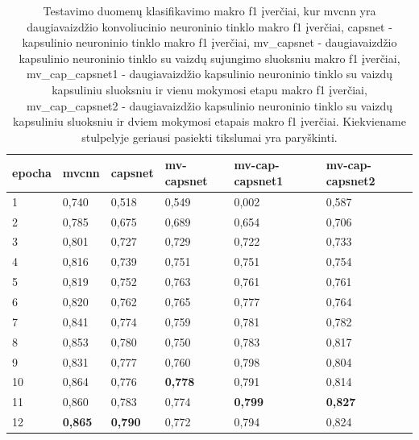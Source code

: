\begin{table}[]
	\caption{
		Testavimo duomenų klasifikavimo makro f1 įverčiai, kur mvcnn yra daugiavaizdžio konvoliucinio neuroninio tinklo makro f1 įverčiai, capsnet - kapsulinio neuroninio tinklo makro f1 įverčiai, mv\_capsnet - daugiavaizdžio kapsulinio neuroninio tinklo su vaizdų sujungimo sluoksniu makro f1 įverčiai, mv\_cap\_capsnet1 - daugiavaizdžio kapsulinio neuroninio tinklo su vaizdų kapsuliniu sluoksniu ir vienu mokymosi etapu makro f1 įverčiai, mv\_cap\_capsnet2 - daugiavaizdžio kapsulinio neuroninio tinklo su vaizdų kapsuliniu sluoksniu ir dviem mokymosi etapais makro f1 įverčiai. Kiekviename stulpelyje geriausi pasiekti tikslumai yra paryškinti.
	}
	\begin{tabular}{l|l|l|l|l|l}
		epocha & mvcnn & capsnet & mv-capsnet & mv-cap-capsnet1 & mv-cap-capsnet2 \\
		\hline
		1 & 0,740 &   0,518 &      0,549 &           0,002 &           0,587 \\
		2 & 0,785 &   0,675 &      0,689 &           0,654 &           0,706 \\
		3 & 0,801 &   0,727 &      0,729 &           0,722 &           0,733 \\
		4 & 0,816 &   0,739 &      0,751 &           0,751 &           0,754 \\
		5 & 0,819 &   0,752 &      0,763 &           0,761 &           0,761 \\
		6 & 0,820 &   0,762 &      0,765 &           0,777 &           0,764 \\
		7 & 0,841 &   0,774 &      0,759 &           0,781 &           0,782 \\
		8 & 0,853 &   0,780 &      0,750 &           0,783 &           0,817 \\
		9 & 0,831 &   0,777 &      0,760 &           0,798 &           0,804 \\
		10 & 0,864 &   0,776 &      \textbf{0,778} &           0,791 &           0,814 \\
		11 & 0,860 &   0,783 &      0,774 &           \textbf{0,799} &           \textbf{0,827} \\
		12 & \textbf{0,865} &   \textbf{0,790} &      0,772 &           0,794 &           0,824 \\
	\end{tabular}
	\label{tbl:macro_f1}
\end{table}


